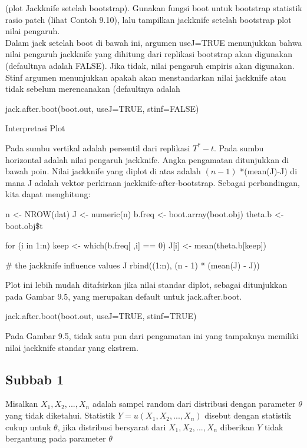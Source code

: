 \documentclass[a4paper,12pt]{article}
\theoremstyle{definition}
\begin{document}
(plot Jackknife setelah bootstrap). Gunakan fungsi boot untuk bootstrap statistik rasio patch (lihat Contoh 9.10), lalu tampilkan jackknife setelah bootstrap plot nilai pengaruh.\\
Dalam jack setelah boot di bawah ini, argumen useJ=TRUE menunjukkan bahwa nilai pengaruh jackknife yang dihitung dari replikasi bootstrap akan digunakan (defaultnya adalah FALSE). Jika tidak, nilai pengaruh empiris akan digunakan. Stinf argumen menunjukkan apakah akan menstandarkan nilai jackknife atau tidak sebelum merencanakan (defaultnya adalah \begin{spverbatim}
jack.after.boot(boot.out, useJ=TRUE, stinf=FALSE)
\end{spverbatim}
Interpretasi Plot

Pada sumbu vertikal adalah persentil dari replikasi $T^{*}-t$. Pada sumbu horizontal adalah nilai pengaruh jackknife. Angka pengamatan ditunjukkan di bawah poin. Nilai jackknife yang diplot di atas adalah $(n - 1)$ *(mean(J)-J) di mana J adalah vektor perkiraan jackknife-after-bootstrap.
Sebagai perbandingan, kita dapat menghitung: 
\begin{spverbatim}
n <- NROW(dat)
J <- numeric(n)
b.freq <- boot.array(boot.obj)
theta.b <- boot.obj\$t

for (i in 1:n) {
    keep <- which(b.freq[ ,i] == 0)
    J[i] <- mean(theta.b[keep])
}

# the jackknife influence values
J
rbind((1:n), (n - 1) * (mean(J) - J))
\end{spverbatim}
Plot ini lebih mudah ditafsirkan jika nilai standar diplot, sebagai ditunjukkan pada Gambar 9.5, yang merupakan default untuk jack.after.boot.
\begin{spverbatim}
jack.after.boot(boot.out, useJ=TRUE, stinf=TRUE)
\end{spverbatim}
Pada Gambar 9.5, tidak satu pun dari pengamatan ini yang tampaknya memiliki nilai jackknife standar yang ekstrem. 
  











\subsection{Subbab 1}
Misalkan $X_1,X_2,...,X_n$ adalah sampel random dari distribusi dengan parameter $\theta$ yang tidak diketahui. Statistik $Y=u(X_1,X_2,...,X_n)$ disebut dengan statistik cukup untuk $\theta$, jika distribusi bersyarat dari $X_1,X_2,...,X_n$ diberikan $Y$ tidak bergantung pada parameter $\theta$
\end{document}
